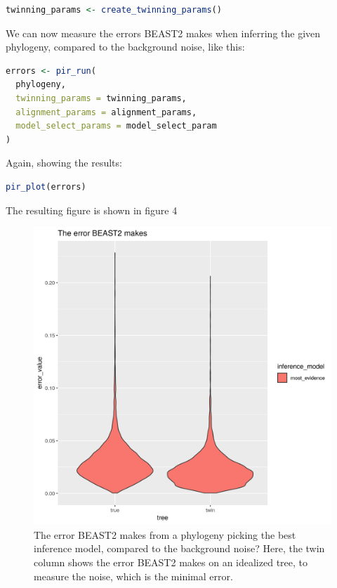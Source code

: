 \documentclass{article}
\begin{document}
\begin{lstlisting}[language=R, floatplacement=H]
twinning_params <- create_twinning_params()
\end{lstlisting}

We can now measure the errors BEAST2
makes when inferring the given phylogeny, compared
to the background noise, like this:

\begin{lstlisting}[language=R, floatplacement=H]
errors <- pir_run(
  phylogeny,
  twinning_params = twinning_params,
  alignment_params = alignment_params,
  model_select_params = model_select_param
)
\end{lstlisting}

Again, showing the results:

\begin{lstlisting}[language=R, floatplacement=H]
pir_plot(errors)
\end{lstlisting}

The resulting figure is shown in figure 4

\begin{figure}[h]
  \includegraphics[width=\textwidth]{figure_4.png}
  \caption{
    The error BEAST2 makes from a phylogeny 
    picking the best inference model, compared to the background noise?
    Here, the twin column shows the error BEAST2 makes on an idealized
    tree, to measure the noise, which is the minimal error.
  }
\end{figure}
\end{document}
